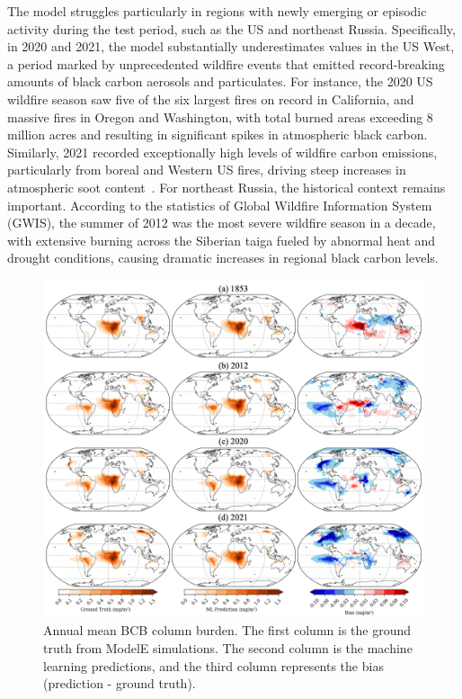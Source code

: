 \documentclass{article}
\begin{document}
    The model struggles particularly in regions with newly emerging or episodic activity during the test period, such as the US and northeast Russia. Specifically, in 2020 and 2021, the model substantially underestimates values in the US West, a period marked by unprecedented wildfire events that emitted record-breaking amounts of black carbon aerosols and particulates. For instance, the 2020 US wildfire season saw five of the six largest fires on record in California, and massive fires in Oregon and Washington, with total burned areas exceeding 8 million acres and resulting in significant spikes in atmospheric black carbon. Similarly, 2021 recorded exceptionally high levels of wildfire carbon emissions, particularly from boreal and Western US fires, driving steep increases in atmospheric soot content~\cite{sannigrahi2022examining}. For northeast Russia, the historical context remains important. According to the statistics of Global Wildfire Information System (GWIS), the summer of 2012 was the most severe wildfire season in a decade, with extensive burning across the Siberian taiga fueled by abnormal heat and drought conditions, causing dramatic increases in regional black carbon levels. %
    
    \begin{figure}[htbp]
        \centering
        \includegraphics[width=1\linewidth]{column_burden.png}
        \caption{Annual mean BCB column burden. The first column is the ground truth from ModelE simulations. The second column is the machine learning predictions, and the third column represents the bias (prediction - ground truth).}
        \label{fig:column_burden}
    \end{figure}
\end{document}
